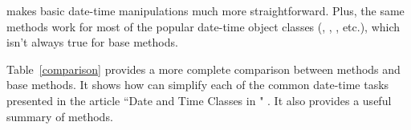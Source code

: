 \documentclass[article]{jss}
\begin{document}
 makes basic date-time manipulations much more straightforward. Plus, the same  methods work for most of the popular date-time object classes (, , , etc.), which isn't always true for base  methods.

Table~\ref{comparison} provides a more complete comparison between  methods and base  methods. It shows how  can simplify each of the common date-time tasks presented in the article ``Date and Time Classes in " \citep{Rnews}. It also provides a useful summary of  methods.



\begin{sidewaystable}[p]


\end{sidewaystable}
\end{document}
